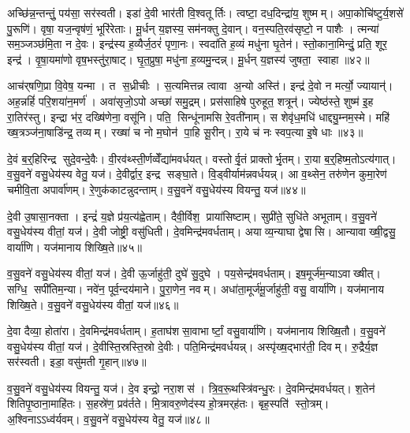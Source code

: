 अच्छि॑न्न॒न्तन्तुं॒ पय॑सा॒ सर॑स्वती। इडा॑ दे॒वी भार॑ती वि॒श्वतूर्तिः। त्वष्टा॒ दध॒दिन्द्रा॑य॒ शुष्मम्। अपा॒कोचि॑ष्टुर्य॒शसे॑ पु॒रूणि॑। वृषा॒ यज॒न्वृष॑णं॒ भूरि॑रेताः। मू॒र्धन् य॒ज्ञस्य॒ सम॑नक्तु दे॒वान्। वन॒स्पति॒रव॑सृष्टो॒ न पाशैः। त्मन्या॑ सम॒ञ्जञ्छ॑मि॒ता न दे॒वः। इन्द्र॑स्य ह॒व्यैर्ज॒ठरं॑ पृणा॒नः। स्वदा॑ति ह॒व्यं मधु॑ना घृ॒तेन॑। स्तो॒काना॒मिन्दुं॒ प्रति॒ शूर॒ इन्द्र॑। वृ॒षा॒यमा॑णो वृष॒भस्तु॑रा॒षाट्। घृ॒त॒प्रुषा॒ मधु॑ना ह॒व्यमु॒न्दन्न्। मू॒र्धन् य॒ज्ञस्य॑ जुषता॒ स्वाहा॥४२॥\anuvakamend[शर्ध॑मानो॒ महो॑भि॒ पत्नीर्घृ॒तेन॑ च॒त्वारि॑ च]

आच॑र्‌षणि॒प्रा वि॒वेष॒ यन्मा। त स॒ध्रीचीः। स॒त्यमित्तन्न त्वावा अ॒न्यो अस्ति॑। इन्द्र॑ दे॒वो न मर्त्यो॒ ज्यायान्॑। अह॒न्नहिं॑ परि॒शया॑न॒मर्ण॑। अवा॑सृजो॒ऽपो अच्छा॑ समु॒द्रम्। प्रस॑साहिषे पुरुहूत॒ शत्रून्॑। ज्येष्ठ॑स्ते॒ शुष्म॑ इ॒ह रा॒तिर॑स्तु। इन्द्रा भ॑र॒ दख्षि॑णेना॒ वसू॑नि। पति॒ सिन्धू॑नामसि रे॒वती॑नाम्। स शेवृ॑ध॒मधि॑ धाद्द्यु॒म्नम॒स्मे। महि॑ ख्ष॒त्रञ्ज॑ना॒षाडि॑न्द्र॒ तव्यम्। रख्षा॑ च नो म॒घोन॑ पा॒हि सू॒रीन्। रा॒ये च॑ नः स्वप॒त्या इ॒षे धाः॥४३॥\anuvakamend[रे॒वती॑नाञ्च॒त्वारि॑ च]

दे॒वं ब॒र्॒हिरिन्द्र सुदे॒वन्दे॒वैः। वी॒रव॑थ्स्ती॒र्णव्वेँद्या॑मवर्धयत्। वस्तोर्वृ॒तं प्राक्तोर्भृ॒तम्। रा॒या ब॒र्॒हिष्म॒तोऽत्य॑गात्। व॒सु॒वने॑ वसु॒धेय॑स्य वेतु॒ यज॑। दे॒वीर्द्वार॒ इन्द्र सङ्घा॒ते। वि॒ड्वीर्याम॑न्नवर्धयन्न्। आ व॒थ्सेन॒ तरु॑णेन कुमा॒रेण॑ चमीवि॒ता अपार्वा॑णम्। रे॒णुक॑काटन्नुदन्ताम्। व॒सु॒वने॑ वसु॒धेय॑स्य वियन्तु॒ यज॑॥४४॥

दे॒वी उ॒षासा॒नक्ता। इन्द्रं॑ य॒ज्ञे प्र॑य॒त्य॑ह्वेताम्। दैवी॒र्विश॒ प्राया॑सिष्टाम्। सुप्री॑ते॒ सुधि॑ते अभूताम्। व॒सु॒वने॑ वसु॒धेय॑स्य वीतां॒ यज॑। दे॒वी जोष्ट्री॒ वसु॑धिती। दे॒वमिन्द्र॑मवर्धताम्। अयाव्य॒न्याघा द्वेषासि। आन्यावाख्षी॒द्वसु॒ वार्या॑णि। यज॑मानाय शिख्षि॒ते॥४५॥

व॒सु॒वने॑ वसु॒धेय॑स्य वीतां॒ यज॑। दे॒वी ऊ॒र्जाहु॑ती॒ दुघे॑ सु॒दुघे। पय॒सेन्द्र॑मवर्धताम्। इष॒मूर्ज॑म॒न्याऽवाख्षीत्। सग्धि॒ सपी॑तिम॒न्या। नवे॑न॒ पूर्व॒न्दय॑माने। पु॒रा॒णेन॒ नवम्। अधा॑ता॒मूर्ज॑मू॒र्जाहु॑ती॒ वसु॒ वार्या॑णि। यज॑मानाय शिख्षि॒ते। व॒सु॒वने॑ वसु॒धेय॑स्य वीतां॒ यज॑॥४६॥

दे॒वा दैव्या॒ होता॑रा। दे॒वमिन्द्र॑मवर्धताम्। ह॒ताघ॑शसा॒वाभार्ष्टां॒ वसु॒वार्या॑णि। यज॑मानाय शिख्षि॒तौ। व॒सु॒वने॑ वसु॒धेय॑स्य वीतां॒ यज॑। दे॒वीस्ति॒स्रस्ति॒स्रो दे॒वीः। पति॒मिन्द्र॑मवर्धयन्न्। अस्पृ॑ख्ष॒द्भार॑ती॒ दिवम्। रु॒द्रैर्य॒ज्ञ सर॑स्वती। इडा॒ वसु॑मती गृ॒हान्॥४७॥

व॒सु॒वने॑ वसु॒धेय॑स्य वियन्तु॒ यज॑। दे॒व इन्द्रो॒ नरा॒शस॑। त्रि॒व॒रू॒थस्त्रि॑वन्धु॒रः। दे॒वमिन्द्र॑मवर्धयत्। श॒तेन॑ शितिपृ॒ष्ठाना॒माहि॑तः। स॒हस्रे॑ण॒ प्रव॑र्तते। मि॒त्रावरु॒णेद॑स्य हो॒त्रमर्‌ह॑तः। बृह॒स्पति॑ स्तो॒त्रम्। अ॒श्विनाऽऽध्व॑र्यवम्। व॒सु॒वने॑ वसु॒धेय॑स्य वेतु॒ यज॑॥४८॥

